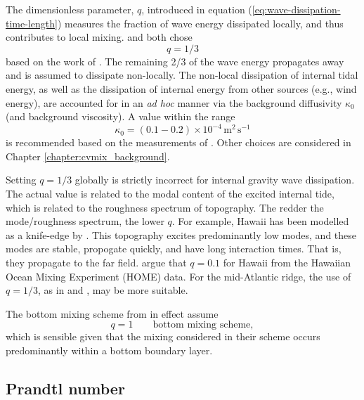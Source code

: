The dimensionless parameter, $q$, introduced in equation
(\ref{eq:wave-dissipation-time-length}) measures the fraction of wave
energy dissipated locally, and thus contributes to local mixing.
\cite{Simmonsetal2004} and \cite{Melet_etal_2013} both chose
\begin{equation}
  q = 1/3
\end{equation}  
based on the work of \cite{StLaurent_etal2002}.  The remaining 2/3 of
the wave energy propagates away and is assumed to dissipate
non-locally.  The non-local dissipation of internal tidal energy, as
well as the dissipation of internal energy from other sources (e.g.,
wind energy), are accounted for in an {\em ad hoc} manner via the
background diffusivity $\kappa_{0}$ (and background viscosity).  A
value within the range
\begin{equation}
  \kappa_{0} = (0.1 - 0.2) \times 10^{-4} \, \mbox{m}^{2} \, \mbox{s}^{-1}
\end{equation}
is recommended based on the measurements of \cite{Ledwell1993}.  Other
choices are considered in Chapter \ref{chapter:cvmix_background}.

Setting $q = 1/3$ globally is strictly incorrect for internal gravity
wave dissipation. The actual value is related to the modal content of
the excited internal tide, which is related to the roughness spectrum
of topography.  The redder the mode/roughness spectrum, the lower $q$.
For example, Hawaii has been modelled as a knife-edge by
\citep{StLaurent_etal2003}.  This topography excites predominantly low
modes, and these modes are stable, propogate quickly, and have long
interaction times.  That is, they propagate to the far field.
\cite{Klymak_etal2005} argue that $q=0.1$ for Hawaii from the Hawaiian
Ocean Mixing Experiment (HOME) data. For the mid-Atlantic ridge, the
use of $q=1/3$, as in \cite{Simmonsetal2004} and
\cite{Melet_etal_2013}, may be more suitable.

The bottom mixing scheme from \cite{Legg_eta2006} in effect assume 
\begin{equation}
 q=1   \qquad \mbox{bottom mixing scheme},
\end{equation}
which is sensible given that the mixing considered in their scheme
occurs predominantly within a bottom boundary layer.


\subsection{Prandtl number}

